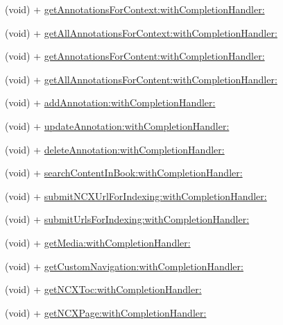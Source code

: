 \begin{DoxyCompactItemize}
\item 
(void) + \hyperlink{interface_pxe_player_interface_ace8a3b481f12dca010a47a46fe69a36d}{get\-Annotations\-For\-Context\-:with\-Completion\-Handler\-:}
\item 
(void) + \hyperlink{interface_pxe_player_interface_a903d9604ba7a9d301e0b8033a9565ad2}{get\-All\-Annotations\-For\-Context\-:with\-Completion\-Handler\-:}
\item 
(void) + \hyperlink{interface_pxe_player_interface_a27bde498b5f150c07e0f789aa99e1b1b}{get\-Annotations\-For\-Content\-:with\-Completion\-Handler\-:}
\item 
(void) + \hyperlink{interface_pxe_player_interface_aebc0248006abba10131e3553ff40d4ab}{get\-All\-Annotations\-For\-Content\-:with\-Completion\-Handler\-:}
\item 
(void) + \hyperlink{interface_pxe_player_interface_ac47bfb15b21608cae29e2a4838ec64a2}{add\-Annotation\-:with\-Completion\-Handler\-:}
\item 
(void) + \hyperlink{interface_pxe_player_interface_adc53fe734a85fd97af5958d0cbc16ded}{update\-Annotation\-:with\-Completion\-Handler\-:}
\item 
(void) + \hyperlink{interface_pxe_player_interface_a348e2206c1409bee27af2d2873ef8dc7}{delete\-Annotation\-:with\-Completion\-Handler\-:}
\item 
(void) + \hyperlink{interface_pxe_player_interface_aaef86247418b4d58a01e1c83f57a5c3f}{search\-Content\-In\-Book\-:with\-Completion\-Handler\-:}
\item 
(void) + \hyperlink{interface_pxe_player_interface_a920aae68ff75b6117c17603d559c8244}{submit\-N\-C\-X\-Url\-For\-Indexing\-:with\-Completion\-Handler\-:}
\item 
(void) + \hyperlink{interface_pxe_player_interface_a4a6b8dfe8ba55b324c996e5bf86baeed}{submit\-Urls\-For\-Indexing\-:with\-Completion\-Handler\-:}
\item 
(void) + \hyperlink{interface_pxe_player_interface_a3f0cffaa7c958a5786897e7c29e06c9d}{get\-Media\-:with\-Completion\-Handler\-:}
\item 
(void) + \hyperlink{interface_pxe_player_interface_a25393c1c2d76de42d468fd94f29e7b77}{get\-Custom\-Navigation\-:with\-Completion\-Handler\-:}
\item 
(void) + \hyperlink{interface_pxe_player_interface_a784fec8cfc6291a17fa28fb2a1dea988}{get\-N\-C\-X\-Toc\-:with\-Completion\-Handler\-:}
\item 
(void) + \hyperlink{interface_pxe_player_interface_a3efd727b89edd4068e0aa83b1b5e4181}{get\-N\-C\-X\-Page\-:with\-Completion\-Handler\-:}

\end{DoxyCompactItemize}
